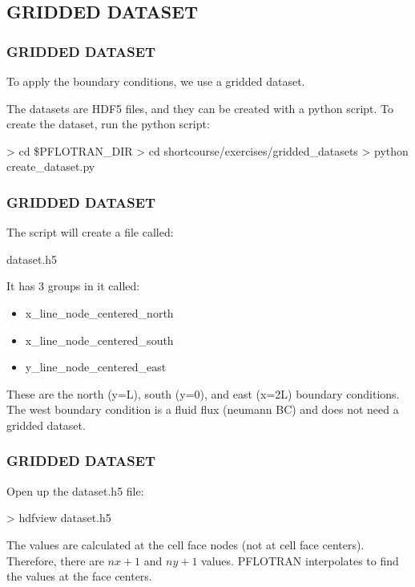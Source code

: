 \documentclass{beamer}
\begin{document}
\subsection{GRIDDED DATASET}

\begin{frame}\frametitle{GRIDDED DATASET}

To apply the boundary conditions, we use a gridded dataset.

The datasets are HDF5 files, and they can be created with a python script.
To create the dataset, run the python script:

\begin{semiverbatim}
> cd \$PFLOTRAN_DIR
> cd shortcourse/exercises/gridded_datasets
> python create_dataset.py
\end{semiverbatim}

\end{frame}

\begin{frame}\frametitle{GRIDDED DATASET}

The script will create a file called:

\begin{semiverbatim}
dataset.h5
\end{semiverbatim}

It has 3 groups in it called:
\begin{itemize}
  \item x\_line\_node\_centered\_north
  \item x\_line\_node\_centered\_south
  \item y\_line\_node\_centered\_east
\end{itemize}

These are the north (y=L), south (y=0), and east (x=2L) boundary conditions.
The west boundary condition is a fluid flux (neumann BC) and does not need a
gridded dataset.
\end{frame}

\begin{frame}\frametitle{GRIDDED DATASET}

Open up the dataset.h5 file:

\begin{semiverbatim}
> hdfview dataset.h5
\end{semiverbatim}

The values are calculated at the cell face nodes (not at cell face centers).
Therefore, there are $nx + 1$ and $ny + 1$ values.
PFLOTRAN interpolates to find the values at the face centers.

\end{frame}
\end{document}
